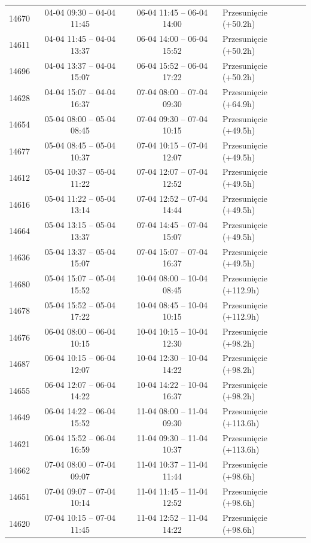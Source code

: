 \begin{table}[htbp]
\begin{tabular}{|r|c|c|l|}
14670 & 04-04 09:30 -- 04-04 11:45 & 06-04 11:45 -- 06-04 14:00 & Przesunięcie (+50.2h) \\ 
14611 & 04-04 11:45 -- 04-04 13:37 & 06-04 14:00 -- 06-04 15:52 & Przesunięcie (+50.2h) \\ 
14696 & 04-04 13:37 -- 04-04 15:07 & 06-04 15:52 -- 06-04 17:22 & Przesunięcie (+50.2h) \\ 
14628 & 04-04 15:07 -- 04-04 16:37 & 07-04 08:00 -- 07-04 09:30 & Przesunięcie (+64.9h) \\ 
14654 & 05-04 08:00 -- 05-04 08:45 & 07-04 09:30 -- 07-04 10:15 & Przesunięcie (+49.5h) \\ 
14677 & 05-04 08:45 -- 05-04 10:37 & 07-04 10:15 -- 07-04 12:07 & Przesunięcie (+49.5h) \\ 
14612 & 05-04 10:37 -- 05-04 11:22 & 07-04 12:07 -- 07-04 12:52 & Przesunięcie (+49.5h) \\ 
14616 & 05-04 11:22 -- 05-04 13:14 & 07-04 12:52 -- 07-04 14:44 & Przesunięcie (+49.5h) \\ 
14664 & 05-04 13:15 -- 05-04 13:37 & 07-04 14:45 -- 07-04 15:07 & Przesunięcie (+49.5h) \\ 
14636 & 05-04 13:37 -- 05-04 15:07 & 07-04 15:07 -- 07-04 16:37 & Przesunięcie (+49.5h) \\ 
14680 & 05-04 15:07 -- 05-04 15:52 & 10-04 08:00 -- 10-04 08:45 & Przesunięcie (+112.9h) \\ 
14678 & 05-04 15:52 -- 05-04 17:22 & 10-04 08:45 -- 10-04 10:15 & Przesunięcie (+112.9h) \\ 
14676 & 06-04 08:00 -- 06-04 10:15 & 10-04 10:15 -- 10-04 12:30 & Przesunięcie (+98.2h) \\ 
14687 & 06-04 10:15 -- 06-04 12:07 & 10-04 12:30 -- 10-04 14:22 & Przesunięcie (+98.2h) \\ 
14655 & 06-04 12:07 -- 06-04 14:22 & 10-04 14:22 -- 10-04 16:37 & Przesunięcie (+98.2h) \\ 
14649 & 06-04 14:22 -- 06-04 15:52 & 11-04 08:00 -- 11-04 09:30 & Przesunięcie (+113.6h) \\ 
14621 & 06-04 15:52 -- 06-04 16:59 & 11-04 09:30 -- 11-04 10:37 & Przesunięcie (+113.6h) \\ 
14662 & 07-04 08:00 -- 07-04 09:07 & 11-04 10:37 -- 11-04 11:44 & Przesunięcie (+98.6h) \\ 
14651 & 07-04 09:07 -- 07-04 10:14 & 11-04 11:45 -- 11-04 12:52 & Przesunięcie (+98.6h) \\ 
14620 & 07-04 10:15 -- 07-04 11:45 & 11-04 12:52 -- 11-04 14:22 & Przesunięcie (+98.6h) \\ 

\end{tabular}
\end{table}
